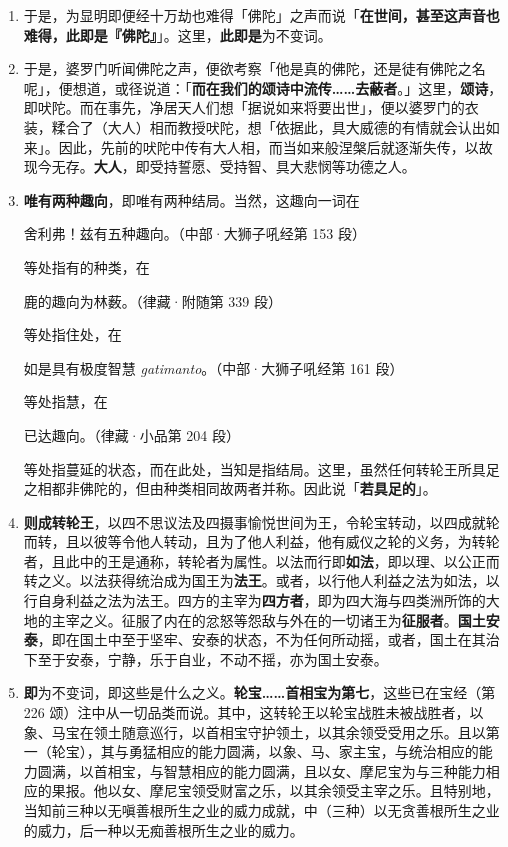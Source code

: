 \begin{enumerate}\item 于是，为显明即便经十万劫也难得「佛陀」之声而说「\textbf{在世间，甚至这声音也难得，此即是『佛陀』}」。这里，\textbf{此即是}为不变词。
\item 于是，婆罗门听闻佛陀之声，便欲考察「他是真的佛陀，还是徒有佛陀之名呢」，便想道，或径说道：「\textbf{而在我们的颂诗中流传……去蔽者}。」这里，\textbf{颂诗}，即吠陀。而在事先，净居天人们想「据说如来将要出世」，便以婆罗门的衣装，糅合了（大人）相而教授吠陀，想「依据此，具大威德的有情就会认出如来」。因此，先前的吠陀中传有大人相，而当如来般涅槃后就逐渐失传，以故现今无存。\textbf{大人}，即受持誓愿、受持智、具大悲悯等功德之人。
\item \textbf{唯有两种趣向}，即唯有两种结局。当然，这趣向一词在\begin{quoting}舍利弗！兹有五种趣向。（中部·大狮子吼经第 153 段）\end{quoting}等处指有的种类，在\begin{quoting}鹿的趣向为林薮。（律藏·附随第 339 段）\end{quoting}等处指住处，在\begin{quoting}如是具有极度智慧 \textit{gatimanto}。（中部·大狮子吼经第 161 段）\end{quoting}等处指慧，在\begin{quoting}已达趣向。（律藏·小品第 204 段）\end{quoting}等处指蔓延的状态，而在此处，当知是指结局。这里，虽然任何转轮王所具足之相都非佛陀的，但由种类相同故两者并称。因此说「\textbf{若具足的}」。
\item \textbf{则成转轮王}，以四不思议法及四摄事愉悦世间为王，令轮宝转动，以四成就轮而转，且以彼等令他人转动，且为了他人利益，他有威仪之轮的义务，为转轮者，且此中的王是通称，转轮者为属性。以法而行即\textbf{如法}，即以理、以公正而转之义。以法获得统治成为国王为\textbf{法王}。或者，以行他人利益之法为如法，以行自身利益之法为法王。四方的主宰为\textbf{四方者}，即为四大海与四类洲所饰的大地的主宰之义。征服了内在的忿怒等怨敌与外在的一切诸王为\textbf{征服者}。\textbf{国土安泰}，即在国土中至于坚牢、安泰的状态，不为任何所动摇，或者，国土在其治下至于安泰，宁静，乐于自业，不动不摇，亦为国土安泰。
\item \textbf{即}为不变词，即这些是什么之义。\textbf{轮宝……首相宝为第七}，这些已在宝经（第 226 颂）注中从一切品类而说。其中，这转轮王以轮宝战胜未被战胜者，以象、马宝在领土随意巡行，以首相宝守护领土，以其余领受受用之乐。且以第一（轮宝），其与勇猛相应的能力圆满，以象、马、家主宝，与统治相应的能力圆满，以首相宝，与智慧相应的能力圆满，且以女、摩尼宝为与三种能力相应的果报。他以女、摩尼宝领受财富之乐，以其余领受主宰之乐。且特别地，当知前三种以无嗔善根所生之业的威力成就，中（三种）以无贪善根所生之业的威力，后一种以无痴善根所生之业的威力。

\end{enumerate}
